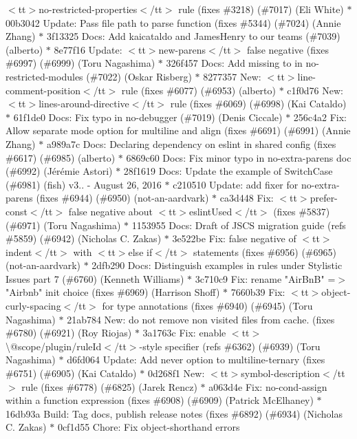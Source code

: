 \begin{DoxyItemize}
$<$tt$>$no-\/restricted-\/properties$<$/tt$>$ rule (fixes \#3218) (\#7017) (\+Eli White) \texorpdfstring{$\ast$}{*} 00b3042 Update\+: Pass file path to parse function (fixes \#5344) (\#7024) (\+Annie Zhang) \texorpdfstring{$\ast$}{*} 3f13325 Docs\+: Add kaicataldo and James\+Henry to our teams (\#7039) (alberto) \texorpdfstring{$\ast$}{*} 8e77f16 Update\+: $<$tt$>$new-\/parens$<$/tt$>$ false negative (fixes \#6997) (\#6999) (\+Toru Nagashima) \texorpdfstring{$\ast$}{*} 326f457 Docs\+: Add missing \textquotesingle{}to\textquotesingle{} in no-\/restricted-\/modules (\#7022) (\+Oskar Risberg) \texorpdfstring{$\ast$}{*} 8277357 New\+: $<$tt$>$line-\/comment-\/position$<$/tt$>$ rule (fixes \#6077) (\#6953) (alberto) \texorpdfstring{$\ast$}{*} c1f0d76 New\+: $<$tt$>$lines-\/around-\/directive$<$/tt$>$ rule (fixes \#6069) (\#6998) (\+Kai Cataldo) \texorpdfstring{$\ast$}{*} 61f1de0 Docs\+: Fix typo in no-\/debugger (\#7019) (\+Denis Ciccale) \texorpdfstring{$\ast$}{*} 256c4a2 Fix\+: Allow separate mode option for multiline and align (fixes \#6691) (\#6991) (\+Annie Zhang) \texorpdfstring{$\ast$}{*} a989a7c Docs\+: Declaring dependency on eslint in shared config (fixes \#6617) (\#6985) (alberto) \texorpdfstring{$\ast$}{*} 6869c60 Docs\+: Fix minor typo in no-\/extra-\/parens doc (\#6992) (\+Jérémie Astori) \texorpdfstring{$\ast$}{*} 28f1619 Docs\+: Update the example of Switch\+Case (\#6981) (fish)  v3.. -\/ August 26, 2016  \texorpdfstring{$\ast$}{*} c210510 Update\+: add fixer for no-\/extra-\/parens (fixes \#6944) (\#6950) (not-\/an-\/aardvark) \texorpdfstring{$\ast$}{*} ca3d448 Fix\+: $<$tt$>$prefer-\/const$<$/tt$>$ false negative about $<$tt$>$eslint\+Used$<$/tt$>$ (fixes \#5837) (\#6971) (\+Toru Nagashima) \texorpdfstring{$\ast$}{*} 1153955 Docs\+: Draft of JSCS migration guide (refs \#5859) (\#6942) (\+Nicholas C. Zakas) \texorpdfstring{$\ast$}{*} 3e522be Fix\+: false negative of $<$tt$>$indent$<$/tt$>$ with $<$tt$>$else if$<$/tt$>$ statements (fixes \#6956) (\#6965) (not-\/an-\/aardvark) \texorpdfstring{$\ast$}{*} 2dfb290 Docs\+: Distinguish examples in rules under Stylistic Issues part 7 (\#6760) (\+Kenneth Williams) \texorpdfstring{$\ast$}{*} 3c710c9 Fix\+: rename "{}Air\+BnB"{} =$>$ "{}Airbnb"{} init choice (fixes \#6969) (\+Harrison Shoff) \texorpdfstring{$\ast$}{*} 7660b39 Fix\+: $<$tt$>$object-\/curly-\/spacing$<$/tt$>$ for type annotations (fixes \#6940) (\#6945) (\+Toru Nagashima) \texorpdfstring{$\ast$}{*} 21ab784 New\+: do not remove non visited files from cache. (fixes \#6780) (\#6921) (\+Roy Riojas) \texorpdfstring{$\ast$}{*} 3a1763c Fix\+: enable $<$tt$>$\textbackslash{}@scope/plugin/rule\+Id$<$/tt$>$-\/style specifier (refs \#6362) (\#6939) (\+Toru Nagashima) \texorpdfstring{$\ast$}{*} d6fd064 Update\+: Add never option to multiline-\/ternary (fixes \#6751) (\#6905) (\+Kai Cataldo) \texorpdfstring{$\ast$}{*} 0d268f1 New\+: $<$tt$>$symbol-\/description$<$/tt$>$ rule (fixes \#6778) (\#6825) (\+Jarek Rencz) \texorpdfstring{$\ast$}{*} a063d4e Fix\+: no-\/cond-\/assign within a function expression (fixes \#6908) (\#6909) (\+Patrick Mc\+Elhaney) \texorpdfstring{$\ast$}{*} 16db93a Build\+: Tag docs, publish release notes (fixes \#6892) (\#6934) (\+Nicholas C. Zakas) \texorpdfstring{$\ast$}{*} 0cf1d55 Chore\+: Fix object-\/shorthand errors 
\end{DoxyItemize}
